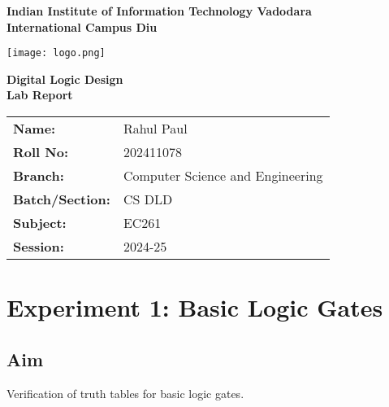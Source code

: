 \documentclass[11pt]{article}
\begin{document}
\begin{titlepage}
    \centering
    {\Huge {\textbf{Indian Institute of Information Technology Vadodara\\}}}
    \vspace{0.25cm}
    {\Huge {\textbf{International Campus Diu}}}
    
    \vspace{1.5cm}
    
    \texttt{[image: logo.png]} 
    
    \vspace{1cm}
    
    \Large \textbf{Digital Logic Design\\Lab Report\\}
    
    \vspace*{2.25cm}
    
    \begin{tabular}{l l}
        \textbf{Name:} & Rahul Paul\\
        \textbf{Roll No:} & 202411078\\
        \textbf{Branch:} & Computer Science and Engineering \\
        \textbf{Batch/Section:} & CS DLD \\
        \textbf{Subject:} & EC261 \\
        \textbf{Session:} & 2024-25 \\
    \end{tabular}
\end{titlepage}

\tableofcontents
\newpage

\section{Experiment 1: Basic Logic Gates}

\subsection{Aim}
Verification of truth tables for basic logic gates.
\end{document}
